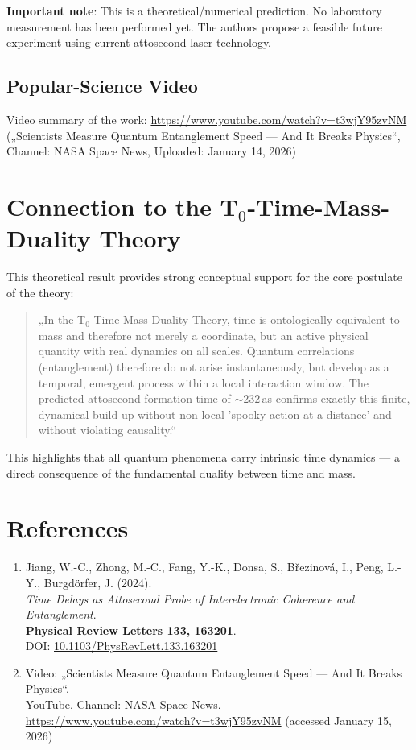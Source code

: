 	\textbf{Important note}: This is a theoretical/numerical prediction. No laboratory measurement has been performed yet. The authors propose a feasible future experiment using current attosecond laser technology.
	
	\subsection{Popular-Science Video}
	Video summary of the work:  
	\url{https://www.youtube.com/watch?v=t3wjY95zvNM}  
	(„Scientists Measure Quantum Entanglement Speed — And It Breaks Physics“, Channel: NASA Space News, Uploaded: January 14, 2026)
	
	\section{Connection to the T$_0$-Time-Mass-Duality Theory}
	This theoretical result provides strong conceptual support for the core postulate of the theory:
	
	\begin{quote}
		„In the T$_0$-Time-Mass-Duality Theory, time is ontologically equivalent to mass and therefore not merely a coordinate, but an active physical quantity with real dynamics on all scales. Quantum correlations (entanglement) therefore do not arise instantaneously, but develop as a temporal, emergent process within a local interaction window. The predicted attosecond formation time of $\sim 232$\,as confirms exactly this finite, dynamical build-up without non-local 'spooky action at a distance' and without violating causality.“
	\end{quote}
	
	This highlights that all quantum phenomena carry intrinsic time dynamics — a direct consequence of the fundamental duality between time and mass.
	
	\section{References}
	\begin{enumerate}[leftmargin=*]
		\item Jiang, W.-C., Zhong, M.-C., Fang, Y.-K., Donsa, S., Březinová, I., Peng, L.-Y., Burgdörfer, J. (2024). \\
		\emph{Time Delays as Attosecond Probe of Interelectronic Coherence and Entanglement}. \\
		\textbf{Physical Review Letters 133, 163201}. \\
		DOI: \href{https://doi.org/10.1103/PhysRevLett.133.163201}{10.1103/PhysRevLett.133.163201}
		\item Video: „Scientists Measure Quantum Entanglement Speed — And It Breaks Physics“. \\
		YouTube, Channel: NASA Space News. \\
		\url{https://www.youtube.com/watch?v=t3wjY95zvNM} (accessed January 15, 2026)
	\end{enumerate}
	